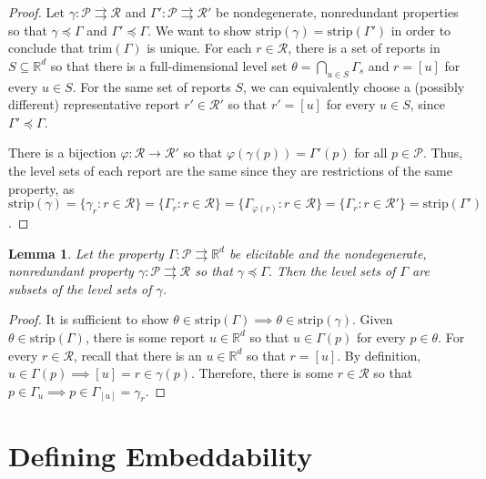 \documentclass[12pt]{article}
\newcommand{\reals}{\mathbb{R}}
\renewcommand{\P}{\mathcal{P}}
\newcommand{\R}{\mathcal{R}}
\newcommand{\toto}{\rightrightarrows}
\newcommand{\trim}{\mathrm{trim}}
\newcommand{\strip}{\mathrm{strip}}
\newtheorem{lemma}{Lemma}
\begin{document}
\begin{proof}
	Let $\gamma:\P \toto \R$ and $\Gamma' : \P \toto \R'$ be nondegenerate, nonredundant properties so that $\gamma \preceq \Gamma$ and $\Gamma'\preceq \Gamma$.
	We want to show $\strip(\gamma) = \strip(\Gamma')$ in order to conclude that $\trim(\Gamma)$ is unique.
	For each $r \in \R$, there is a set of reports in $S \subseteq \reals^d$ so that there is a full-dimensional level set $\theta = \bigcap_{u\in S}\Gamma_s$ and $r = [u]$ for every $u \in S$.
	For the same set of reports $S$, we can equivalently choose a (possibly different) representative report $r' \in \R'$ so that $r' = [u]$ for every $u \in S$, since $\Gamma' \preceq \Gamma$.
	
	There is a bijection $\varphi : \R \to \R'$ so that $\varphi(\gamma(p)) = \Gamma'(p)$ for all $p \in \P$.
	Thus, the level sets of each report are the same since they are restrictions of the same property, as $\strip(\gamma) = \{ \gamma_r : r \in \R \} = \{ \Gamma_r : r \in \R \} = \{ \Gamma_{\varphi(r)} : r \in \R \} = \{ \Gamma_r : r \in \R' \} = \strip(\Gamma')$.
\end{proof}

\begin{lemma}\label{lem:lev-sets-subsets}
	Let the property $\Gamma: \P \toto \reals^d$ be elicitable and the nondegenerate, nonredundant property $\gamma: \P \toto \R$ so that $\gamma \preceq \Gamma$.
	Then the level sets of $\Gamma$ are subsets of the level sets of $\gamma$.
\end{lemma}

\begin{proof}
	It is sufficient to show $\theta \in \strip(\Gamma) \implies \theta \in \strip(\gamma)$.
	Given $\theta \in \strip(\Gamma)$, there is some report $u \in \reals^d$ so that $u \in \Gamma(p)$ for every $p \in \theta$.
	For every $r \in \R$, recall that there is an $u \in \reals^d$ so that $r = [u]$.
	By definition, $u \in \Gamma(p) \implies [u] = r \in \gamma(p)$.
	Therefore, there is some $r \in \R$ so that $p \in \Gamma_u \implies p \in \Gamma_{[u]} = \gamma_{r}$.
\end{proof}

\section{Defining Embeddability}
\end{document}
